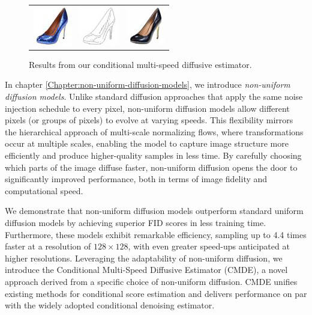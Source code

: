 \begin{figure}[h]
\begin{center}
\begin{tabular}{ccc}
        \includegraphics[width=.13\textwidth]{Outline/figures/non-uniform-diffusion-models/189_x.png} &   
        \includegraphics[width=.13\textwidth]{Outline/figures/non-uniform-diffusion-models/189_y.png} &
        \includegraphics[width=.13\textwidth]{Outline/figures/non-uniform-diffusion-models/189_2.png}  \\
    \end{tabular}
    \end{center}
    \caption{Results from our conditional multi-speed diffusive estimator.}
    \label{fig: teaser}
\end{figure}

In chapter \ref{Chapter:non-uniform-diffusion-models}, we introduce \emph{non-uniform diffusion models}. Unlike standard diffusion approaches that apply the same noise injection schedule to every pixel, non-uniform diffusion models allow different pixels (or groups of pixels) to evolve at varying speeds. This flexibility mirrors the hierarchical approach of multi-scale normalizing flows, where transformations occur at multiple scales, enabling the model to capture image structure more efficiently and produce higher-quality samples in less time. By carefully choosing which parts of the image diffuse faster, non-uniform diffusion opens the door to significantly improved performance, both in terms of image fidelity and computational speed.

We demonstrate that non-uniform diffusion models outperform standard uniform diffusion models by achieving superior FID scores in less training time. Furthermore, these models exhibit remarkable efficiency, sampling up to 4.4 times faster at a resolution of $128 \times 128$, with even greater speed-ups anticipated at higher resolutions. Leveraging the adaptability of non-uniform diffusion, we introduce the Conditional Multi-Speed Diffusive Estimator (CMDE), a novel approach derived from a specific choice of non-uniform diffusion. CMDE unifies existing methods for conditional score estimation and delivers performance on par with the widely adopted conditional denoising estimator.

